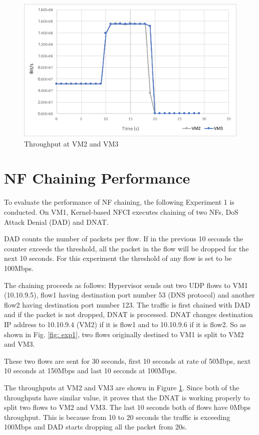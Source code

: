 \begin{figure}
	\centering
	\includegraphics[width=120mm]{pics/throughput.pdf}
	\caption{Throughput at VM2 and VM3}
	\label{fig: result1}
\end{figure}

\section{NF Chaining Performance}
To evaluate the performance of NF chaining, the following Experiment 1 is conducted. On VM1, Kernel-based NFCI executes chaining of two NFs, DoS Attack Denial (DAD) and DNAT. 

DAD counts the number of packets per flow. If in the previous 10 seconds the counter exceeds the threshold, all the packet in the flow will be dropped for the next 10 seconds. For this experiment the threshold of any flow is set to be 100Mbps. 

The chaining proceeds as follows: Hypervisor sends out two UDP flows to VM1 (10.10.9.5), flow1 having destination port number 53 (DNS protocol) and another flow2 having destination port number 123. The traffic is first chained with DAD and if the packet is not dropped, DNAT is processed. DNAT changes destination IP address to 10.10.9.4 (VM2) if it is flow1 and to 10.10.9.6 if it is flow2. So as shown in Fig. \ref{fig: exp1}, two flows originally destined to VM1 is split to VM2 and VM3. 

These two flows are sent for 30 seconds, first 10 seconds at rate of 50Mbps, next 10 seconds at 150Mbps and last 10 seconds at 100Mbps. 

The throughputs at VM2 and VM3 are shown in Figure \ref{fig: result1}.
Since both of the throughputs have similar value, it proves that the DNAT is working properly to split two flows to VM2 and VM3. The last 10 seconds both of flows have 0Mbps throughput. This is because from 10 to 20 seconds the traffic is exceeding 100Mbps and DAD starts dropping all the packet from 20s. 


